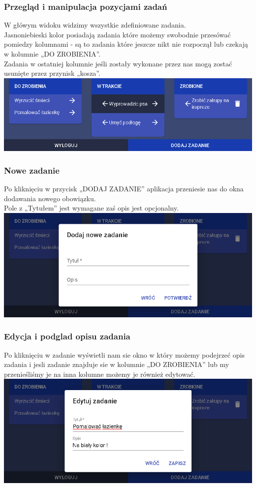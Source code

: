 \documentclass[12pt,a4paper]{article}  %
\begin{document}
		\subsubsection{Przegląd i manipulacja pozycjami zadań}
		W główym widoku widzimy wszystkie zdefiniowane zadania. \\
		Jasnoniebieski kolor posiadają zadania które możemy swobodnie przesówać pomiedzy kolumnami - są to zadania które jeszcze nikt nie rozpoczął lub czekają w kolumnie „DO ZROBIENIA”. \\
		Zadania w ostatniej kolumnie jeśli zostały wykonane przez nas mogą zostać usunięte przez przynisk „kosza”.\\
		\includegraphics[keepaspectratio,scale=0.5]{./img/dashboard.PNG} 
		\subsubsection{Nowe zadanie}
		Po kliknięciu w przycisk „DODAJ ZADANIE” aplikacja przeniesie nas do okna dodawania nowego obowiązku. \\
		Pole z „Tytułem” jest wymagane zaś opis jest opcjonalny. \\
		\includegraphics[keepaspectratio,scale=0.5]{./img/new.PNG} 
		\subsubsection{Edycja i podglad opisu zadania}
		Po kliknięciu w zadanie wyświetli nam sie okno w który możemy podejrzeć opis zadania i jesli zadanie znajduje sie w kolumnie „DO ZROBIENIA” lub my przenieśliśmy je na inna kolumne możemy je również edytować. \\
		\includegraphics[keepaspectratio,scale=0.5]{./img/edit.PNG} \\
\end{document}
